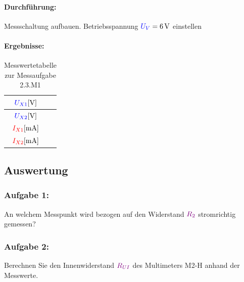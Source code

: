 \documentclass[11pt,a4paper,titlepage,parskip=half]{scrreprt}
\begin{document}
                    \paragraph{Durchführung:} Messschaltung aufbauen. Betriebsspannung $\textcolor{blue}{U_V} = \SI{6}{\volt}$ einstellen
                    \pagebreak
                    \paragraph{Ergebnisse:}
                        \begin{center}
                            \begin{table}[H]
                                \caption{Messwertetabelle zur Messaufgabe 2.3.M1}
                                \label{tbl:messergebnisse2.2}
                                \renewcommand{\arraystretch}{1.6}
                                \begin{center}
                                    \begin{tabular}{c|c}
                                        $\textcolor{blue}{U_{X1}} [\si{\volt}]$ & \qquad\qquad\qquad\\\hline
                                        $\textcolor{blue}{U_{X2}} [\si{\volt}]$ & \\ \hline
                                        $\textcolor{red}{I_{X1}} [\si{\milli\ampere}]$ & \\\hline
                                        $\textcolor{red}{I_{X2}} [\si{\milli\ampere}]$ & 
                                    \end{tabular}
                                \end{center}
                            \end{table}
                        \end{center}
                  
                
            \subsection{Auswertung}
                \subsubsection{Aufgabe 1:}  An welchem Messpunkt wird bezogen auf den Widerstand $\textcolor{violet}{R_2}$ stromrichtig gemessen?
                                
                
                \subsubsection{Aufgabe 2:} Berechnen Sie den Innenwiderstand $\textcolor{violet}{R_{UI}}$ des Multimeters M2-H anhand der Messwerte.
                
\end{document}

